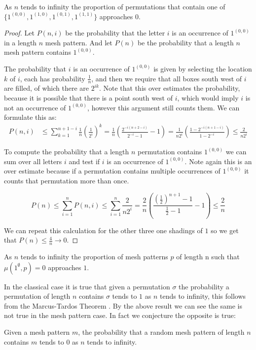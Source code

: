 \documentclass[11pt,a4paper,oneside]{article}
\begin{document}
\begin{lem}
As $n$ tends to infinity the proportion of permutations that contain one of $\{1^{(0,0)},1^{(1,0)},1^{(0,1)},1^{(1,1)}\}$ approaches $0$.
\begin{proof}
Let $P(n,i)$ be the probability that the letter $i$ is an occurrence of $1^{(0,0)}$ in a length $n$ mesh pattern. And let $P(n)$ be the probability that a length $n$ mesh pattern contains $1^{(0,0)}$.

The probability that $i$ is an occurrence of $1^{(0,0)}$ is given by selecting the location $k$ of $i$, each has probability $\frac{1}{n}$, and then we require that all boxes south west of $i$ are filled, of which there are $2^{ik}$. Note that this over estimates the probability, because it is possible that there is a point south west of $i$, which would imply $i$ is not an occurrence of $1^{(0,0)}$, however this argument still counts them. We can formulate this as:
\begin{align*}
P(n,i)&\le\sum_{k=1}^{n+1-i}\frac{1}{n}\left(\frac{1}{2^i}\right)^k=\frac{1}{n}\left(\frac{2^{-i(n+2-i)}}{2^{-i}-1}-1\right)=\frac{1}{n2^i}\left(\frac{1-2^{-i(n+1-i)}}{1-2^{-i}}\right)\le\frac{2}{n2^i}
\end{align*}

To compute the probability that a length $n$ permutation contains $1^{(0,0)}$ we can sum over all letters $i$ and test if $i$ is an occurrence of $1^{(0,0)}$. Note again this is an over estimate because if a permutation contains multiple occurrences of $1^{(0,0)}$ it counts that permutation more than once.

$$P(n)\le\sum_{i=1}^{n}P(n,i)\le\sum_{i=1}^{n}\frac{2}{n2^i}=\frac{2}{n}\left(\frac{\left(\frac{1}{2}\right)^{n+1}-1}{\frac{1}{2}-1}-1\right)\le\frac{2}{n} $$

We can repeat this calculation for the other three one shadings of $1$ so we get that $P(n)\le \frac{4}{n}\rightarrow 0$.
\end{proof}
\end{lem}
\begin{cor}
As $n$ tends to infinity the proportion of mesh patterns $p$ of length n such that $\mu(1^\emptyset,p)=0$ approaches $1$.
\end{cor}


In the classical case it is true that given a permutation $\sigma$ the probability a permutation of length $n$ contains $\sigma$ tends to $1$ as $n$ tends to infinity, this follows from the Marcus-Tardos Theorem \cite{MT04}. By the above result we can see the same is not true in the mesh pattern case. In fact we conjecture the opposite is true:
\begin{conj}
Given a mesh pattern $m$, the probability that a random mesh pattern of length $n$ contains $m$ tends to $0$ as $n$ tends to infinity.
\end{conj}
\end{document}
